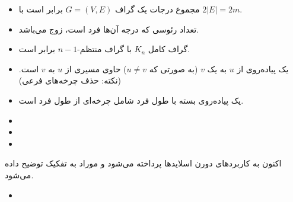 \documentclass[a4paper,10pt]{article}
\begin{document}
    \begin{itemize}
        
        \item مجموع درجات یک گراف $G=(V,E)$ برابر است با $2|E|=2m$.
        
        \item تعداد رئوسی که درجه آن‌ها فرد است، زوج می‌باشد.

        \item گراف کامل $K_n$ با گراف منتظم-$n-1$ برابر است.

        \item یک پیاده‌روی از $u$ به یک $v$ (به صورتی که $u \neq v$) حاوی مسیری از $u$ به $v$ است. (نکته: حذف چرخه‌های فرعی)

        \item یک پیاده‌روی بسته با طول فرد شامل چرخه‌ای از طول فرد است.

        \item 

        \item

        \item 

    \end{itemize}

    اکنون به کاربردهای دورن اسلایدها پرداخته می‌شود و موراد به تفکیک توضیح داده می‌شود.

    \begin{itemize}
        
        \item 

    \end{itemize}

    \noindent\hrulefill
\end{document}
